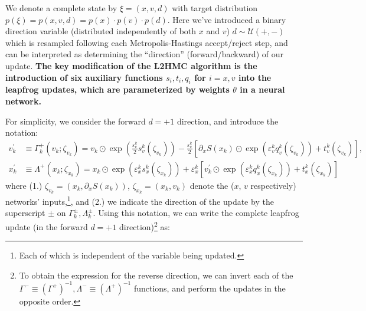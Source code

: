 \documentclass{article} %
\begin{document}
We denote a complete state by \(\xi = (x, v, d)\) with target distribution \(p(\xi) = p(x, v, d) = p(x)\cdot p(v)\cdot
p(d)\).
%
Here we've introduced a binary direction variable (distributed independently of both \(x\) and \(v\))
\(d\sim\mathcal{U}(+,-)\) which is resampled following each Metropolis-Hastings accept/reject step, and can be
interpreted as determining the ``direction'' (forward/backward) of our update.
%
\textbf{The key modification of the L2HMC algorithm is the introduction of six auxiliary functions \(s_{i}, t_{i}, q_{i}\) for \(i
= x, v\) into the leapfrog updates, which are parameterized by weights \(\theta\) in a neural network.}
%

For simplicity, we consider the forward \(d=+1\) direction, and introduce the notation:
%
\begin{align}
   v^{\prime}_{k} &\equiv \Gamma^{+}_{k}(v_{k};\zeta_{v_{k}})
   = v_{k}\odot \exp{\left(\tfrac{\varepsilon^{k}_{v}}{2}s_{v}^{k}(\zeta_{v_{k}})\right)} -
   \tfrac{\varepsilon^{k}_{v}}{2}{\left[\partial_{x}S(x_{k})\odot\exp{\left(\varepsilon^{k}_{v} q_{v}^{k}(\zeta_{v_{k}})\right)}
      +t_{v}^{k}(\zeta_{v_{k}})\right]},\label{eq:new_momentum_update}\\
   x^{\prime}_{k} &\equiv \Lambda^{+}(x_{k};\zeta_{x_{k}})
   = x_{k}\odot\exp(\varepsilon^{k}_{x} s^{k}_{x}(\zeta_{x_{k}}))
   + \varepsilon^{k}_{x}\left[v^{\prime}_{k}\odot\exp(\varepsilon^{k}_{x} q^{k}_{x}(\zeta_{x_{k}}))
         + t^{k}_{x}(\zeta_{x_{k}})\right]\label{eq:new_position_update}
\end{align}
%
where (1.) \(\zeta_{v_{k}} = (x_{k}, \partial_{x}S(x_{k}))\), \(\zeta_{x_{k}} = (x_{k}, v_{k})\) denote the (\(x\),
\(v\) respectively) networks' inputs,\footnote{%
   Each of which is independent of the variable being updated.
}, and (2.) we indicate the direction of the update by the superscript \(\pm\) on \(\Gamma^{\pm}_{k},
\Lambda^{\pm}_{k}\).
%
Using this notation, we can write the complete leapfrog update (in the forward \(d=+1\) direction)\footnote{%
   To obtain the expression for the reverse direction, we can invert each of the
   \(\Gamma^{-}\equiv{\left(\Gamma^{+}\right)}^{-1}, \Lambda^{-}\equiv{\left(\Lambda^{+}\right)}^{-1}\) functions, and
   perform the updates in the opposite order.
}%
as:
%
\end{document}
